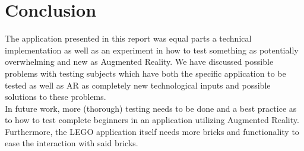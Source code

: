 
\section{Conclusion}
The application presented in this report was equal parts a technical implementation as well as an experiment in how to test something as potentially overwhelming and new as Augmented Reality. We have discussed possible problems with testing subjects which have both the specific application to be tested as well as AR as completely new technological inputs and possible solutions to these problems.\\
In future work, more (thorough) testing needs to be done and a best practice as to how to test complete beginners in an application utilizing Augmented Reality. Furthermore, the LEGO application itself needs more bricks and functionality to ease the interaction with said bricks.